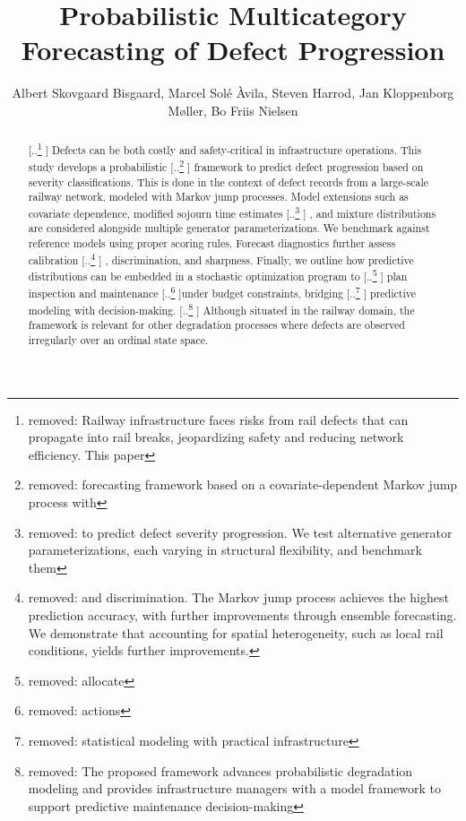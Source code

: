 \documentclass{article}
\title{Probabilistic Multicategory Forecasting of \DIFdelbegin \DIFdel{Rail }\DIFdelend Defect Progression}
\author{Albert Skovgaard Bisgaard, Marcel Solé Àvila, Steven Harrod, Jan Kloppenborg Møller, Bo Friis Nielsen} %
\date{}
\providecommand{\DIFadd}[1]{{\protect\color{blue} \sf #1}} %
\providecommand{\DIFdel}[1]{{\protect\color{red} [..\footnote{removed: #1} ]}} %
\providecommand{\DIFaddbegin}{} %
\providecommand{\DIFaddend}{} %
\providecommand{\DIFdelbegin}{} %
\providecommand{\DIFdelend}{} %
\begin{document}
\maketitle


\begin{abstract}
\DIFdelbegin \DIFdel{Railway infrastructure faces risks from rail defects that can propagate into rail breaks, jeopardizing safety and reducing network efficiency. 
This paper }\DIFdelend \DIFaddbegin \DIFadd{Defects can be both costly and safety-critical in infrastructure operations. 
This study }\DIFaddend develops a probabilistic \DIFdelbegin \DIFdel{forecasting framework based on a covariate-dependent Markov jump process with }\DIFdelend \DIFaddbegin \DIFadd{framework to predict defect progression based on severity classifications.
This is done in the context of defect records from a large-scale railway network, modeled with Markov jump processes.
Model extensions such as covariate dependence, }\DIFaddend modified sojourn time estimates\DIFdelbegin \DIFdel{to predict defect severity progression. We test alternative generator parameterizations, each varying in structural flexibility, and benchmark them }\DIFdelend \DIFaddbegin \DIFadd{, and mixture distributions are considered alongside multiple generator parameterizations.
We benchmark }\DIFaddend against reference models using proper scoring rules. Forecast diagnostics further assess calibration\DIFdelbegin \DIFdel{and discrimination. The Markov jump process achieves the highest prediction accuracy, with further improvements through ensemble forecasting. 
We demonstrate that accounting for spatial heterogeneity, such as local rail conditions, yields further improvements. }\DIFdelend \DIFaddbegin \DIFadd{, discrimination, and sharpness. 
}\DIFaddend Finally, we outline how predictive distributions can be embedded in a stochastic optimization program to \DIFdelbegin \DIFdel{allocate }\DIFdelend \DIFaddbegin \DIFadd{plan }\DIFaddend inspection and maintenance \DIFdelbegin \DIFdel{actions }\DIFdelend under budget constraints, bridging \DIFdelbegin \DIFdel{statistical modeling with practical infrastructure }\DIFdelend \DIFaddbegin \DIFadd{predictive modeling with }\DIFaddend decision-making.
\DIFdelbegin \DIFdel{The proposed framework advances probabilistic degradation modeling and provides infrastructure managers with a model framework to support predictive maintenance decision-making}\DIFdelend \DIFaddbegin \DIFadd{Although situated in the railway domain, the framework is relevant for other degradation processes where defects are observed irregularly over an ordinal state space}\DIFaddend .
\end{abstract}
\DIFdelbegin %
\end{document}
